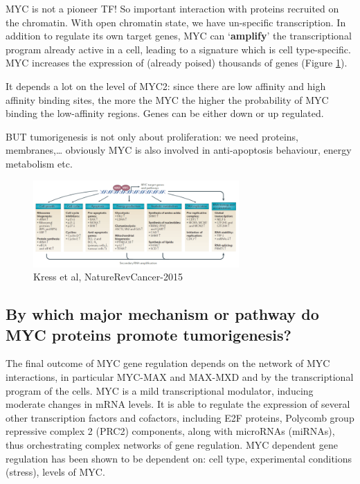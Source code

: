 MYC is not a pioneer TF! So important interaction with proteins recruited on the chromatin.
With open chromatin state, we have un-specific transcription. In addition to regulate its own target genes, MYC can `\textbf{amplify}' the transcriptional program already active in a cell, leading to a signature which is cell type-specific. MYC increases the expression of (already poised) thousands of genes (Figure \ref{fig:ppmyc}).

It depends a lot on the level of MYC2: since there are low affinity and high affinity binding sites, the more the MYC the higher the probability of MYC binding the low-affinity regions. Genes can be either down or up regulated.

BUT tumorigenesis is not only about proliferation: we need proteins, membranes,\ldots{} obviously MYC is also involved in anti-apoptosis behaviour, energy metabolism etc.

\begin{figure}
\centering
\includegraphics[width=0.7\textwidth]{../_resources/cdb9692b7dd2ca7bcfae696cd1b1ce36.png}
\caption{Kress et al, NatureRevCancer-2015}
\label{fig:ppmyc}
\end{figure}

\hypertarget{by-which-major-mechanism-or-pathway-myc-proteins-promote-tumorigenesis}{%
\subsection{By which major mechanism or pathway do MYC proteins promote tumorigenesis?}\label{by-which-major-mechanism-or-pathway-myc-proteins-promote-tumorigenesis}}

The final outcome of MYC gene regulation depends on the network of MYC interactions, in particular MYC-MAX
and MAX-MXD and by the transcriptional program of the cells.
MYC is a mild transcriptional modulator, inducing moderate changes in mRNA levels.
It is able to regulate the expression of several other transcription factors and cofactors, including E2F proteins,
Polycomb group repressive complex 2 (PRC2) components, along with microRNAs (miRNAs), thus orchestrating
complex networks of gene regulation.
MYC dependent gene regulation has been shown to be dependent on: cell type, experimental conditions (stress),
levels of MYC.


